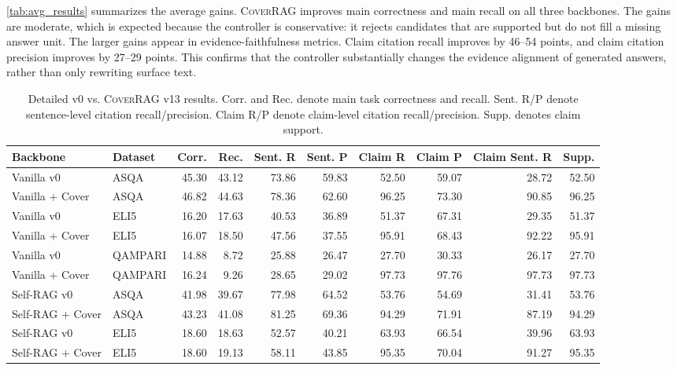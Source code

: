 \autoref{tab:avg_results} summarizes the average gains. \textsc{CoverRAG} improves main correctness and main recall on all three backbones. The gains are moderate, which is expected because the controller is conservative: it rejects candidates that are supported but do not fill a missing answer unit. The larger gains appear in evidence-faithfulness metrics. Claim citation recall improves by 46--54 points, and claim citation precision improves by 27--29 points. This confirms that the controller substantially changes the evidence alignment of generated answers, rather than only rewriting surface text.

\begin{table}[t]
    \centering
    \caption{Detailed v0 vs. \textsc{CoverRAG} v13 results. Corr. and Rec. denote main task correctness and recall. Sent. R/P denote sentence-level citation recall/precision. Claim R/P denote claim-level citation recall/precision. Supp. denotes claim support.}
    \label{tab:main_results}
    \scriptsize
    \setlength{\tabcolsep}{2.5pt}
    \begin{tabular}{llrrrrrrrr}
        \toprule
        Backbone & Dataset & Corr. & Rec. & Sent. R & Sent. P & Claim R & Claim P & Claim Sent. R & Supp. \\
        \midrule
        Vanilla v0 & ASQA & 45.30 & 43.12 & 73.86 & 59.83 & 52.50 & 59.07 & 28.72 & 52.50 \\
        Vanilla + Cover & ASQA & 46.82 & 44.63 & 78.36 & 62.60 & 96.25 & 73.30 & 90.85 & 96.25 \\
        Vanilla v0 & ELI5 & 16.20 & 17.63 & 40.53 & 36.89 & 51.37 & 67.31 & 29.35 & 51.37 \\
        Vanilla + Cover & ELI5 & 16.07 & 18.50 & 47.56 & 37.55 & 95.91 & 68.43 & 92.22 & 95.91 \\
        Vanilla v0 & QAMPARI & 14.88 & 8.72 & 25.88 & 26.47 & 27.70 & 30.33 & 26.17 & 27.70 \\
        Vanilla + Cover & QAMPARI & 16.24 & 9.26 & 28.65 & 29.02 & 97.73 & 97.76 & 97.73 & 97.73 \\
        \midrule
        Self-RAG v0 & ASQA & 41.98 & 39.67 & 77.98 & 64.52 & 53.76 & 54.69 & 31.41 & 53.76 \\
        Self-RAG + Cover & ASQA & 43.23 & 41.08 & 81.25 & 69.36 & 94.29 & 71.91 & 87.19 & 94.29 \\
        Self-RAG v0 & ELI5 & 18.60 & 18.63 & 52.57 & 40.21 & 63.93 & 66.54 & 39.96 & 63.93 \\
        Self-RAG + Cover & ELI5 & 18.60 & 19.13 & 58.11 & 43.85 & 95.35 & 70.04 & 91.27 & 95.35 \\

\end{tabular}
\end{table}
